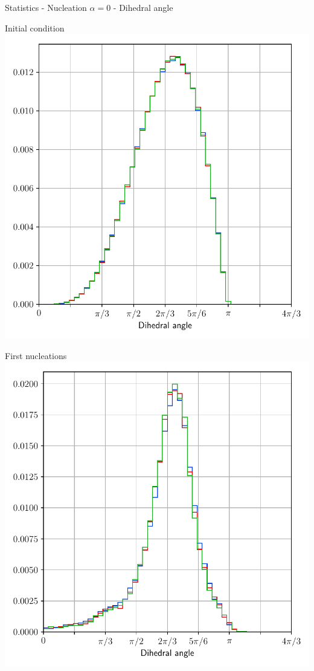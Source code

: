 \documentclass[usenames,dvipsnames]{beamer}
\begin{document}
\begin{frame}{Statistics - Nucleation $\alpha = 0$ - Dihedral angle}
    \begin{minipage}{0.5\textwidth}
    \centering
    \scriptsize
    Initial condition
    \includegraphics[trim={0 2.6em 0 1.1em},clip=true,scale=0.34]{figures/stored_energy/SE/dihedral/000000_nuclconstant_set.pdf}
    \end{minipage}%
    \begin{minipage}{0.5\textwidth}
    \centering
    \scriptsize
    First nucleations
    \includegraphics[trim={0 2.6em 0 1.1em},clip=true,scale=0.34]{figures/stored_energy/SE/dihedral/000070_nuclconstant_set.pdf}

\end{minipage}
\end{frame}
\end{document}
